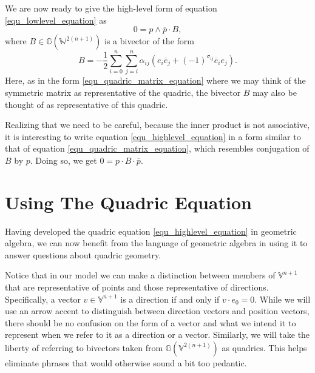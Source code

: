 \documentclass{ecgd-l}
\theoremstyle{definition}
\theoremstyle{remark}
\numberwithin{equation}{section}
\newcommand{\G}{\mathbb{G}}
\newcommand{\V}{\mathbb{V}}
\newcommand{\W}{\mathbb{W}}
\begin{document}
We are now ready to give the high-level form of equation \eqref{equ_lowlevel_equation} as
\begin{equation}\label{equ_highlevel_equation}
0 = p\wedge\overline{p}\cdot B,
\end{equation}
where $B\in\G(\W^{2(n+1)})$ is a bivector of the form
\begin{equation}
B = -\frac{1}{2}\sum_{i=0}^n\sum_{j=i}^n\alpha_{ij}(e_i\overline{e}_j+(-1)^{\sigma_{ij}}\overline{e}_ie_j).
\end{equation}
Here, as in the form \eqref{equ_quadric_matrix_equation} where we may think of
the symmetric matrix as representative of the quadric, the bivector $B$ may also be thought
of as representative of this quadric.

Realizing that we need to be careful, because the inner product is not associative,
it is interesting to write equation \eqref{equ_highlevel_equation} in a form
similar to that of equation \eqref{equ_quadric_matrix_equation}, which
resembles conjugation of $B$ by $p$.  Doing so, we get $0 = p\cdot B\cdot\overline{p}$.

\section{Using The Quadric Equation}

Having developed the quadric equation \eqref{equ_highlevel_equation} in geometric algebra, we can
now benefit from the language of geometric algebra in using it to answer questions about quadric geometry.

Notice that in our model we can make a distinction between members of $\V^{n+1}$ that are
representative of points and those representative of directions.  Specifically, a vector $v\in\V^{n+1}$
is a direction if and only if $v\cdot e_0=0$.  While we will use an arrow accent to distinguish
between direction vectors and position vectors, there should be no confusion on the form
of a vector and what we intend it to represent when we refer to it as a direction or a vector.
Similarly, we will take the liberty of referring to bivectors taken
from $\G(\V^{2(n+1)})$ as quadrics.  This helps eliminate phrases that would otherwise sound a bit
too pedantic.
\end{document}
